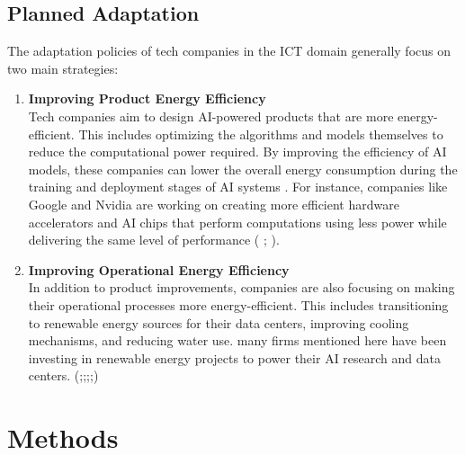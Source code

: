 \documentclass[12pt]{article}
\begin{document}
\subsection*{Planned Adaptation}
The adaptation policies of tech companies in the ICT domain generally focus on two main strategies:
\begin{enumerate}
    \item \textbf{Improving Product Energy Efficiency} \\ Tech companies aim to design AI-powered products that are more energy-efficient. This includes optimizing the algorithms and 
    models themselves to reduce the computational power required. By improving the efficiency of AI models, these companies can lower the overall energy consumption during 
    the training and deployment stages of AI systems . For instance, companies like Google and Nvidia are working on creating more efficient hardware accelerators and AI 
    chips that perform computations using less power while delivering the same level of performance (\cite{google_2024_environmental} ; \cite{nvidia_2024}).
    \item \textbf{Improving Operational Energy Efficiency} \\ In addition to product improvements, companies are also focusing on making their operational processes more energy-efficient. This includes 
    transitioning to renewable energy sources for their data centers, improving cooling mechanisms, and reducing water use. many firms mentioned here have been investing in renewable energy 
    projects to power their AI research and data centers. (\cite{apple_2024_environmental};\cite{amazon_2023_amazon};\cite{meta_sustainability_2023};\cite{google_2024_environmental};\cite{nvidia_2024}) 
     
\end{enumerate}

\section*{Methods}
\end{document}
